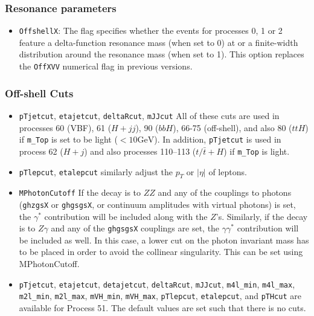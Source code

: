\documentclass[aps,superscriptaddress,nofootinbib]{revtex4}
\begin{document}
\subsubsection{Resonance parameters}
\begin{itemize}
\item {\verb|OffshellX|}: The flag specifies whether the events for processes 0, 1 or 2 feature a delta-function resonance mass (when set to 0) at or a finite-width distribution around the resonance mass (when set to 1). This option replaces the \verb|OffXVV| numerical flag in previous versions.
\end{itemize}
\subsubsection{Off-shell Cuts}
\begin{itemize}
\item \verb|pTjetcut|, \verb|etajetcut|, \verb|deltaRcut|, \verb|mJJcut| All of these cuts are used in processes 60 (VBF), 61 ($H+jj$), 90 ($bbH$), 66-75 (off-shell), and also 80 ($ttH$) if \verb|m_Top| is set to be light ($<10 \text{GeV}$).  In addition, \verb|pTjetcut| is used in process 62 ($H+j$) and also processes 110--113 ($t/\bar{t}+H$) if \verb|m_Top| is light.
\item \verb|pTlepcut|, \verb|etalepcut| similarly adjust the $p_T$ or $|\eta|$ of leptons.
\item \verb|MPhotonCutoff| If the decay is to $ZZ$ and any of the couplings to photons (\verb|ghzgsX| or \verb|ghgsgsX|, or continuum amplitudes with virtual photons) is set, the $\gamma^*$ contribution will be included along with the $Z$'s.  Similarly, if the decay is to $Z\gamma$ and any of the \verb|ghgsgsX| couplings are set, the $\gamma\gamma^*$ contribution will be included as well.  In this case, a lower cut on the photon invariant mass has to be placed in order to avoid the collinear singularity.  This can be set using MPhotonCutoff.
\item \verb|pTjetcut|, \verb|etajetcut|, \verb|detajetcut|, \verb|deltaRcut|, \verb|mJJcut|, \verb|m4l_min|, \verb|m4l_max|, \verb|m2l_min|, \verb|m2l_max|, \verb|mVH_min|, \verb|mVH_max|, \verb|pTlepcut|, \verb|etalepcut|, and \verb|pTHcut| are available for Process 51. The default values are set such that there is no cuts.
\end{itemize}
\end{document}
